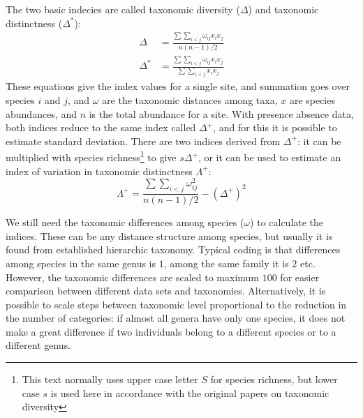 \documentclass[a4paper,10pt]{amsart}
\begin{document}
The two basic indecies are called taxonomic diversity ($\Delta$) and
taxonomic distinctness ($\Delta^*$):
\begin{align}
  \Delta &= \frac{\sum \sum_{i<j} \omega_{ij} x_i x_j}{n (n-1) / 2}\\
\Delta^* &= \frac{\sum \sum_{i<j} \omega_{ij} x_i x_j}{\sum \sum_{i<j} x_i x_j}
\end{align}
These equations give the index values for a single site, and summation
goes over species $i$ and $j$, and $\omega$ are the taxonomic
distances among taxa, $x$ are species abundances, and $n$ is the total
abundance for a site.  With presence absence data, both indices
reduce to the same index called $\Delta^+$, and for this it is
possible to estimate standard deviation. There are two indices
derived from $\Delta^+$: it can be multiplied with species
richness\footnote{This text normally uses upper case letter $S$ for
  species richness, but lower case $s$ is used here in accordance with
  the original papers on taxonomic diversity}
to give $s \Delta^+$, or it can be used to estimate an index of
variation in taxonomic distinctness $\Lambda^+$:
\begin{equation}
  \Lambda^+ = \frac{\sum \sum_{i<j} \omega_{ij}^2}{n (n-1) / 2} - (\Delta^+)^2
\end{equation}

We still need the taxonomic differences among species ($\omega$) to
calculate the indices. These can be any
distance structure among species, but usually it is found from
established hierarchic taxonomy. Typical coding is that differences
among species in the same genus is $1$, among the same family it is
$2$ etc. However, the taxonomic differences are scaled to maximum
$100$ for easier comparison between different data sets and
taxonomies. Alternatively, it is possible to scale steps between
taxonomic level proportional to the reduction in the number of
categories: if almost all genera have only one species, it does not
make a great difference if two individuals belong to a different
species or to a different genus.
\end{document}

